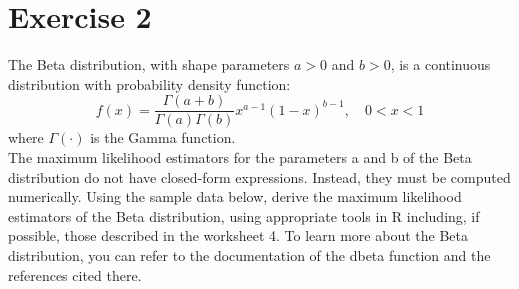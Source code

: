 \documentclass{article}\usepackage[]{graphicx}\usepackage[]{xcolor}
\begin{document}
\section{Exercise 2}
The Beta distribution, with shape parameters \(a > 0\) and \(b > 0\), is a continuous distribution with probability density function:
\[f(x) = \frac{\Gamma(a+b)}{\Gamma(a)\Gamma(b)}x^{a-1}(1-x)^{b-1}, \quad 0<x<1\]
where \(\Gamma(\cdot)\) is the Gamma function. \\
The maximum likelihood estimators for the parameters a and b of the Beta distribution do not have closed-form expressions. Instead, they must be computed numerically. Using the sample data below, derive the maximum likelihood estimators of the Beta distribution, using appropriate tools in R including, if possible, those described in the worksheet 4. To learn more about the Beta distribution, you can refer to the documentation of the dbeta function and the references cited there.
\end{document}
